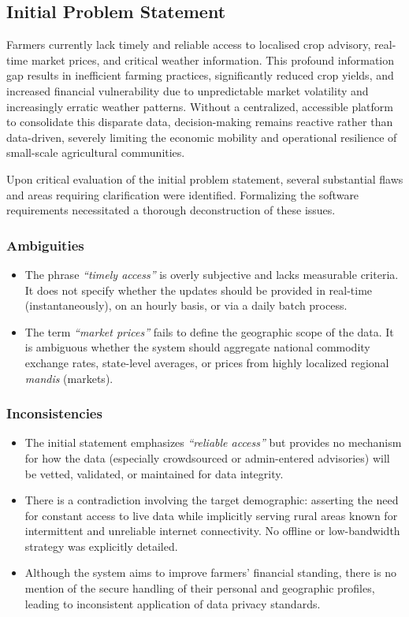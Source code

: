 \subsection{Initial Problem Statement}
Farmers currently lack timely and reliable access to localised crop advisory, real-time market prices, and critical weather information. This profound information gap results in inefficient farming practices, significantly reduced crop yields, and increased financial vulnerability due to unpredictable market volatility and increasingly erratic weather patterns. Without a centralized, accessible platform to consolidate this disparate data, decision-making remains reactive rather than data-driven, severely limiting the economic mobility and operational resilience of small-scale agricultural communities.

Upon critical evaluation of the initial problem statement, several substantial flaws and areas requiring clarification were identified. Formalizing the software requirements necessitated a thorough deconstruction of these issues.

\subsubsection*{Ambiguities}
\begin{itemize}
    \item The phrase \textit{``timely access''} is overly subjective and lacks measurable criteria. It does not specify whether the updates should be provided in real-time (instantaneously), on an hourly basis, or via a daily batch process.
    \item The term \textit{``market prices''} fails to define the geographic scope of the data. It is ambiguous whether the system should aggregate national commodity exchange rates, state-level averages, or prices from highly localized regional \textit{mandis} (markets).
\end{itemize}

\subsubsection*{Inconsistencies}
\begin{itemize}
    \item The initial statement emphasizes \textit{``reliable access''} but provides no mechanism for how the data (especially crowdsourced or admin-entered advisories) will be vetted, validated, or maintained for data integrity.
    \item There is a contradiction involving the target demographic: asserting the need for constant access to live data while implicitly serving rural areas known for intermittent and unreliable internet connectivity. No offline or low-bandwidth strategy was explicitly detailed.
    \item Although the system aims to improve farmers' financial standing, there is no mention of the secure handling of their personal and geographic profiles, leading to inconsistent application of data privacy standards.
\end{itemize}

